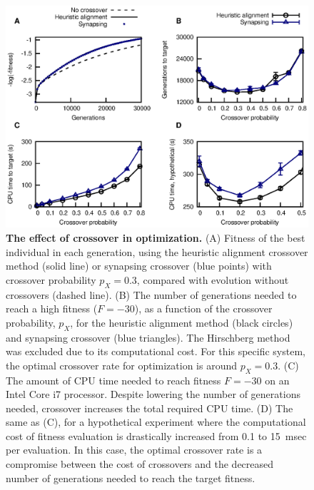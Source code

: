 \documentclass[10pt]{article}
\begin{document}
\begin{figure}[p]
  \centering
  \includegraphics[width=\textwidth]{figures/fig_cost.eps}
  \caption{\textbf{The effect of crossover in optimization.}
    (A) Fitness of the best individual in each generation, using the
    heuristic alignment crossover method (solid line) or synapsing crossover
    (blue points) with crossover probability $p_X=0.3$,
    compared with evolution without crossovers (dashed line).
    (B) The number of generations needed to reach a high fitness ($F=-30$), as a
    function of the crossover probability, $p_X$, for the heuristic alignment method
    (black circles) and synapsing crossover (blue triangles). The Hirschberg method
    was excluded due to its computational cost. For this specific system, the optimal
    crossover rate for optimization is around $p_X=0.3$.
    (C) The amount of CPU time needed to reach fitness $F = -30$ on an
    Intel Core i7 processor. Despite lowering the number of generations needed,
    crossover increases the total required CPU time.
    (D) The same as (C), for a hypothetical experiment where the computational
    cost of fitness evaluation is drastically increased from 0.1 to 15~msec per
    evaluation.
    In this case, the optimal crossover rate is a compromise between the cost of
    crossovers and the decreased number of generations needed to reach the
    target fitness.
  }
  \label{fig:cost}
\end{figure}
\end{document}
